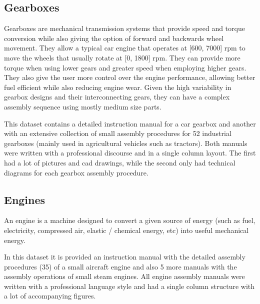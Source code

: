 \subsection{Gearboxes}

Gearboxes are mechanical transmission systems that provide speed and torque conversion while also giving the option of forward and backwards wheel movement. They allow a typical car engine that operates at [600, 7000] \gls{rpm} to move the wheels that usually rotate at [0, 1800] \gls{rpm}. They can provide more torque when using lower gears and greater speed when employing higher gears. They also give the user more control over the engine performance, allowing better fuel efficient while also reducing engine wear. Given the high variability in gearbox designs and their interconnecting gears, they can have a complex assembly sequence using mostly medium size parts.

This dataset contains a detailed instruction manual for a car gearbox and another with an extensive collection of small assembly procedures for 52 industrial gearboxes (mainly used in agricultural vehicles such as tractors). Both manuals were written with a professional discourse and in a single column layout. The first had a lot of pictures and \gls{cad} drawings, while the second only had technical diagrams for each gearbox assembly procedure.


\subsection{Engines}

An engine is a machine designed to convert a given source of energy (such as fuel, electricity, compressed air, elastic / chemical energy, etc) into useful mechanical energy.

In this dataset it is provided an instruction manual with the detailed assembly procedures (35) of a small aircraft engine and also 5 more manuals with the assembly operations of small steam engines. All engine assembly manuals were written with a professional language style and had a single column structure with a lot of accompanying figures.


